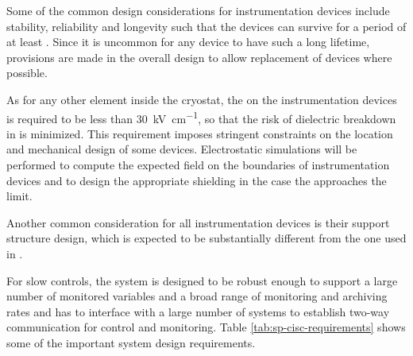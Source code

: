Some of the common design considerations for
instrumentation devices include stability, reliability and longevity
such that the devices can survive for a period of at least %
\dunelifetime{}.  Since it is uncommon for any device
to have such a long lifetime, provisions are made in the overall
design to allow replacement of devices where possible.

As for any other element inside the cryostat, 
the \efield on the instrumentation devices is 
required to be less than \SI{30}{kV\per\cm},
so that the risk of dielectric breakdown in \lar is minimized.
This requirement imposes stringent constraints on the location and mechanical 
design of some devices. Electrostatic simulations 
will be performed to compute the expected field on the boundaries of 
instrumentation devices and to design the appropriate \efield shielding
in the case the \efield approaches the limit. 

Another common consideration for all instrumentation devices is their support structure
design, which is expected to be substantially different from the one used in .

For slow controls, the system %
is designed to be robust enough to support a large number of monitored variables and a broad range of
monitoring and archiving rates and has %
to interface
with a large number of systems to establish two-way communication for
control and monitoring. Table \ref{tab:sp-cisc-requirements} shows
some of the important  system design requirements.


